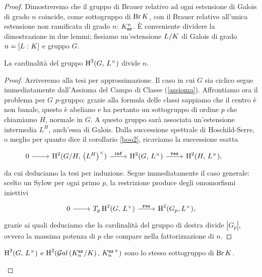 \begin{proof}
Dimostreremo che il gruppo di Brauer relativo ad ogni estensione di Galois di grado $ n $ coincide, come sottogruppo di $ \operatorname{Br} K $, con il Brauer relativo all'unica estensione non ramificata di grado $ n $: $ K_\mathtt{nr}^n $. È conveniente dividere la dimostrazione in due lemmi;
fissiamo un'estensione $ L/K $ di Galois di grado $ n = [L\,\colon K] $ e gruppo $ G $.

\begin{lemma}\label{Br1}
	La cardinalità del gruppo $ \operatorname{H}^2(G,\, L^\times ) $ divide $ n $.
\end{lemma}

\begin{proof}
	Arriveremo alla tesi per approssimazione. %
	Il caso in cui $ G $ sia ciclico segue immediatamente dall'Assioma del Campo di Classe (\ref{assioma}). Affrontiamo ora il problema per $ G $ $ p $-gruppo: grazie alla formula delle classi sappiamo che il centro è non banale, questo è abeliano e ha pertanto un sottogruppo di ordine $ p $ che chiamiamo $ H $, normale in $ G $. A questo gruppo sarà associata un'estensione intermedia $ L^H $, anch'essa di Galois. Dalla successione spettrale di Hoschild-Serre, o meglio per quanto dice il corollario \ref{boo2}, ricaviamo la successione esatta
	\[\begin{tikzcd}
	0 \rar & \HH^2(G/H, \, \left({L^H}\right)^\times) \rar["\Inf"]
	& \HH^2(G, \, L^\times) \rar["\Res"]
	& \HH^2(H, \, L^\times),
	\end{tikzcd} \qquad  \]
	da cui deduciamo la tesi per induzione. Segue immediatamente il caso generale: scelto un Sylow per ogni primo $ p $, la restrizione produce degli omomorfismi iniettivi
	\[ \begin{tikzcd}
	0 \rar & T_p\HH^2(G, \, L^\times) \rar["\Res"] & \HH^2(G_p, L^\times),
	\end{tikzcd}  \]
	grazie ai quali deduciamo che la cardinalità del gruppo di destra divide $ |G_p| $, ovvero la massima potenza di $ p $ che compare nella fattorizzazione di $ n $.
\end{proof}

\begin{lemma}\label{br2}
	$ \operatorname{H}^2(G,\, L^\times ) $ e $ \operatorname{H}^2(\mathcal{G}al\left( {K^\mathtt{nr}_n}/K \right),\, {K^\mathtt{nr}_n}^{\times}) $ sono lo stesso sottogruppo di $ \operatorname{Br} K $.
\end{lemma}


\end{proof}
